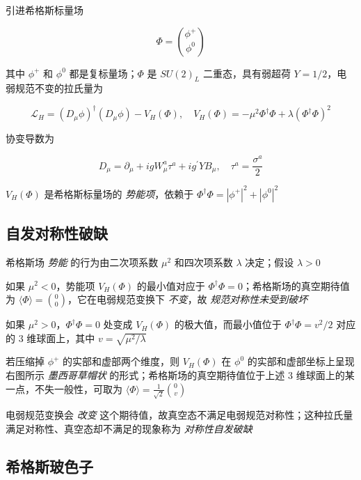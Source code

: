 引进希格斯标量场

\begin{equation}
    \Phi = \binom{\phi^+}{\phi^0}
\end{equation}

其中 $\phi^+$ 和 $\phi^0$ 都是复标量场；$\Phi$ 是 $SU(2)_L$ 二重态，具有弱超荷 $Y=1/2$，电弱规范不变的拉氏量为

\begin{equation}
    \mathcal{L}_H = (D_\mu \phi)^\dagger (D_\mu \phi) - V_H(\Phi), \quad V_H(\Phi) = -\mu^2 \Phi^\dagger \Phi + \lambda (\Phi^\dagger \Phi)^2
\end{equation}

协变导数为

\begin{equation}
    D_\mu = \partial_\mu + ig W_\mu^a \tau^a + ig^\prime Y B_\mu, \quad \tau^a = \frac{\sigma^a}{2}
\end{equation}

$V_H(\Phi)$ 是希格斯标量场的 \emph{势能项}，依赖于 $\Phi^\dagger \Phi = |\phi^+|^2 + |\phi^0|^2$

\subsection{自发对称性破缺}

希格斯场 \emph{势能} 的行为由二次项系数 $\mu^2$ 和四次项系数 $\lambda$ 决定；假设 $\lambda > 0$

如果 $\mu^2 < 0$，势能项 $V_H(\Phi)$ 的最小值对应于 $\Phi^\dagger \Phi = 0$；希格斯场的真空期待值为 $\langle \Phi \rangle = \binom{0}{0}$，它在电弱规范变换下 \emph{不变}，故 \emph{规范对称性未受到破坏}

如果 $\mu^2 > 0$，$\Phi^\dagger \Phi = 0$ 处变成 $V_H(\Phi)$ 的极大值，而最小值位于 $\Phi^\dagger \Phi = v^2/2$ 对应的 $3$ 维球面上，其中 $v = \sqrt{\mu^2/\lambda}$

若压缩掉 $\phi^+$ 的实部和虚部两个维度，则 $V_H(\Phi)$ 在 $\phi^0$ 的实部和虚部坐标上呈现右图所示 \emph{墨西哥草帽状} 的形式；希格斯场的真空期待值位于上述 $3$ 维球面上的某一点，不失一般性，可取为 $\langle \Phi \rangle = \frac{1}{\sqrt{2}} \binom{0}{v}$

电弱规范变换会 \emph{改变} 这个期待值，故真空态不满足电弱规范对称性；这种拉氏量满足对称性、真空态却不满足的现象称为 \emph{对称性自发破缺}

\subsection{希格斯玻色子}

